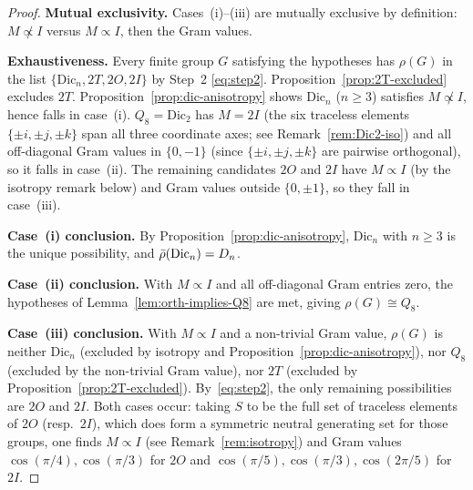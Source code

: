   \begin{proof}
    \textbf{Mutual exclusivity.}
    Cases~(i)--(iii) are mutually exclusive by definition: $M \not\propto I$ versus
    $M \propto I$, then the Gram values.

    \textbf{Exhaustiveness.}
    Every finite group $G$ satisfying the hypotheses has $\rho(G)$ in the list
    $\{\mathrm{Dic}_n, 2T, 2O, 2I\}$ by Step~2 \eqref{eq:step2}.
    Proposition~\ref{prop:2T-excluded} excludes $2T$.
    Proposition~\ref{prop:dic-anisotropy} shows $\mathrm{Dic}_n$ ($n \ge 3$) satisfies
    $M \not\propto I$, hence falls in case~(i).
    $Q_8 = \mathrm{Dic}_2$ has $M = 2I$ (the six traceless elements $\{\pm i, \pm j, \pm k\}$
    span all three coordinate axes; see Remark~\ref{rem:Dic2-iso}) and all off-diagonal
    Gram values in $\{0, -1\}$ (since $\{\pm i, \pm j, \pm k\}$ are pairwise orthogonal),
    so it falls in case~(ii).
    The remaining candidates $2O$ and $2I$ have $M \propto I$ (by the isotropy remark
    below) and Gram values outside $\{0, \pm 1\}$, so they fall in case~(iii).

    \textbf{Case~(i) conclusion.}
    By Proposition~\ref{prop:dic-anisotropy}, $\mathrm{Dic}_n$ with $n \ge 3$ is the
    unique possibility, and $\bar{\rho}(\mathrm{Dic}_n) = D_n$.

    \textbf{Case~(ii) conclusion.}
    With $M \propto I$ and all off-diagonal Gram entries zero, the hypotheses of
    Lemma~\ref{lem:orth-implies-Q8} are met, giving $\rho(G) \cong Q_8$.

    \textbf{Case~(iii) conclusion.}
    With $M \propto I$ and a non-trivial Gram value, $\rho(G)$ is neither $\mathrm{Dic}_n$
    (excluded by isotropy and Proposition~\ref{prop:dic-anisotropy}), nor $Q_8$
    (excluded by the non-trivial Gram value), nor $2T$
    (excluded by Proposition~\ref{prop:2T-excluded}).
    By~\eqref{eq:step2}, the only remaining possibilities are $2O$ and $2I$.
    Both cases occur: taking $S$ to be the full set of traceless elements of $2O$
    (resp.\ $2I$), which does form a symmetric neutral generating set for those groups,
    one finds $M \propto I$ (see Remark~\ref{rem:isotropy}) and Gram values
    $\cos(\pi/4), \cos(\pi/3)$ for $2O$ and
    $\cos(\pi/5), \cos(\pi/3), \cos(2\pi/5)$ for $2I$.
  \end{proof}


